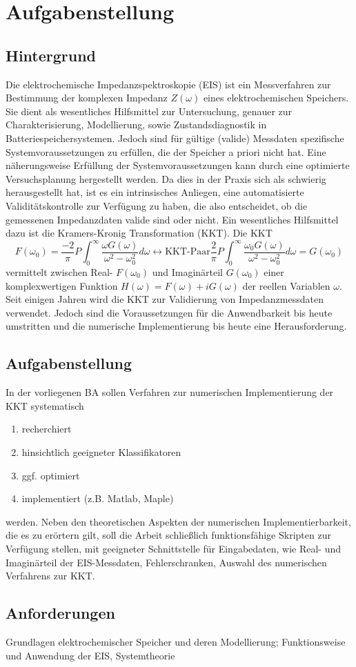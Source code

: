 \chapter{Aufgabenstellung}\label{task}
\section{Hintergrund}\label{sec:backgr}
Die elektrochemische Impedanzspektroskopie (EIS) ist ein Messverfahren zur Bestimmung der komplexen Impedanz $Z(\omega)$ eines elektrochemischen Speichers. Sie dient als wesentliches Hilfsmittel zur Untersuchung, genauer zur Charakterisierung, Modellierung, sowie Zustandsdiagnostik in Batteriespeichersystemen. Jedoch sind für gültige (valide) Messdaten spezifische Systemvoraussetzungen zu erfüllen, die der Speicher a priori nicht hat. Eine näherungsweise Erfüllung der Systemvoraussetzungen kann durch eine optimierte Versuchsplanung hergestellt werden. Da dies in der Praxis sich als schwierig herausgestellt hat, ist es ein intrinsisches Anliegen, eine automatisierte Validitätskontrolle zur Verfügung zu haben, die also entscheidet, ob die gemessenen Impedanzdaten valide sind oder nicht. Ein wesentliches Hilfsmittel dazu ist die Kramers-Kronig Transformation (KKT).
Die KKT
\[
	F(\omega_0) = \frac{-2}{\pi} P \int_0^{\infty} \frac{\omega G(\omega)}{\omega^2-\omega_0^2} d\omega 
	 \longleftrightarrow{\text{KKT-Paar}} 
	\frac{2}{\pi} P \int_0^{\infty} \frac{\omega_0 G(\omega)}{\omega^2-\omega_0^2} d\omega = G(\omega_0)
\]
vermittelt zwischen Real- $F(\omega_0)$ und Imaginärteil $G(\omega_0)$ einer komplexwertigen Funktion $H(\omega) = F(\omega) + iG(\omega)$ der reellen Variablen $\omega$. Seit einigen Jahren wird die KKT zur Validierung von Impedanzmessdaten verwendet. Jedoch sind die Voraussetzungen für die Anwendbarkeit bis heute umstritten und die numerische Implementierung bis heute eine Herausforderung.
\section{Aufgabenstellung}\label{sec:task}
In der vorliegenen BA sollen Verfahren zur numerischen Implementierung der KKT systematisch 
\begin{enumerate}
\item recherchiert
\item hinsichtlich geeigneter Klassifikatoren
\item ggf. optimiert 
\item implementiert (z.B. Matlab, Maple)
\end{enumerate}
werden. Neben den theoretischen Aspekten der numerischen Implementierbarkeit, die es zu erörtern gilt, soll die Arbeit schließlich funktionsfähige Skripten zur Verfügung stellen, mit geeigneter Schnittstelle für Eingabedaten, wie Real- und Imaginärteil der EIS-Messdaten, Fehlerschranken, Auswahl des numerischen Verfahrens zur KKT.
\section{Anforderungen}\label{sec:requirem}
Grundlagen elektrochemischer Speicher und deren Modellierung; Funktionsweise und Anwendung der EIS, Systemtheorie